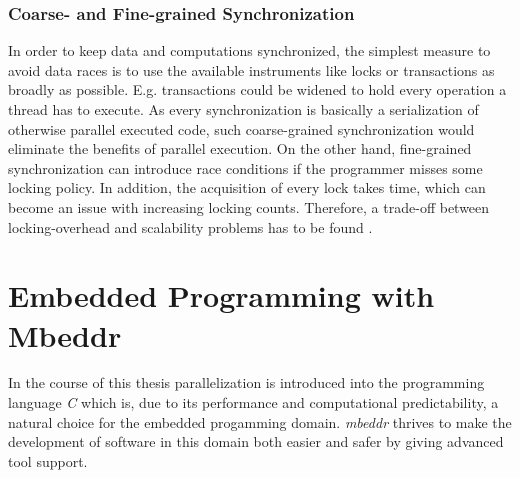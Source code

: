 \subsubsection{Coarse- and Fine-grained Synchronization}
In order to keep data and computations synchronized, the simplest measure to avoid data races is to use the available instruments like locks or transactions as broadly as possible. E.g. transactions could be widened to hold every operation a thread has to execute. As every synchronization is basically a serialization of otherwise parallel executed code, such coarse-grained synchronization would eliminate the benefits of parallel execution. On the other hand, fine-grained synchronization can introduce race conditions if the programmer misses some locking policy. In addition, the acquisition of every lock takes time, which can become an issue with increasing locking counts. Therefore, a trade-off between locking-overhead and scalability problems has to be found \cite[pp.~1-2]{PrinciplesOfTransactionalMemory}.


\section{Embedded Programming with Mbeddr}
In the course of this thesis parallelization is introduced into the programming language \textit{C} which is, due to its performance and computational predictability, a natural choice for the embedded progamming domain. \textit{mbeddr} thrives to make the development of software in this domain both easier and safer by giving advanced tool support. 

